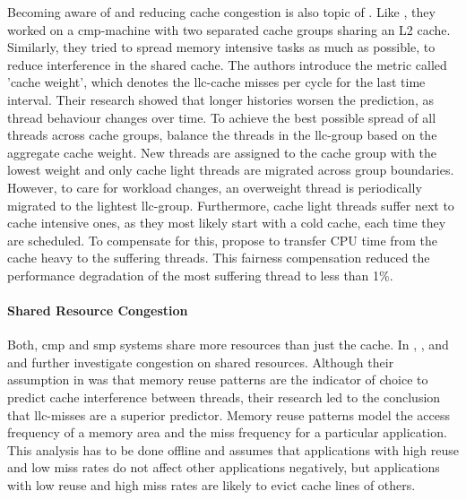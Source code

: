 Becoming aware of and reducing cache congestion is also topic of
\cite{knauerhase_using_2008}.
Like \citeauthor{banikazemi_pam_2008}, they worked on a \gls{cmp}-machine with
two separated cache groups sharing an L2 cache.
Similarly, they tried to spread memory intensive tasks as much as possible,
to reduce interference in the shared cache.
The authors introduce the metric called 'cache weight', which denotes the
\gls{llc}-cache misses per cycle for the last time interval.
Their research showed that longer histories worsen the prediction, as thread
behaviour changes over time.
To achieve the best possible spread of all threads across cache groups,
\citeauthor{knauerhase_using_2008} balance the threads in the \gls{llc}-group
based on the aggregate cache weight.
New threads are assigned to the cache group with the lowest weight and only
cache light threads are migrated across group boundaries.
However, to care for workload changes, an overweight thread is periodically
migrated to the lightest \gls{llc}-group.
Furthermore, cache light threads suffer next to cache intensive ones, as they
most likely start with a cold cache, each time they are scheduled.
To compensate for this, \citeauthor{knauerhase_using_2008} propose to transfer
CPU time from the cache heavy to the suffering threads.
This fairness compensation reduced the performance degradation of the most
suffering thread to less than 1\%.
\\

\paragraph{Shared Resource Congestion}
Both, \gls{cmp} and \gls{smp} systems share more resources than just the cache.
In \cite{fedorova_managing_2010}, \cite{zhuravlev_addressing_2010}, and
\cite{zhuravlev_survey_2012} \citeauthor{fedorova_managing_2010} and
\citeauthor{zhuravlev_addressing_2010} further investigate congestion on shared
resources.
Although their assumption in \cite{fedorova_managing_2010} was that memory
reuse patterns are the indicator of
choice to predict cache interference between threads, their research led to
the conclusion that \gls{llc}-misses are a superior predictor.
Memory reuse patterns model the access frequency of a memory area and the miss
frequency for a particular application.
This analysis has to be done offline and assumes that applications with high
reuse and low miss rates do not affect other applications negatively, but
applications with low reuse and high miss rates are likely to evict cache lines
of others.


